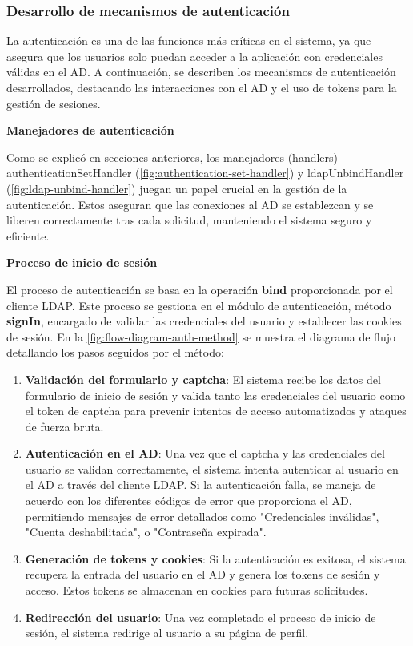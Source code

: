 \subsubsection{Desarrollo de mecanismos de autenticación}

La autenticación es una de las funciones más críticas en el sistema, ya que asegura que los usuarios solo puedan acceder a la aplicación con credenciales válidas en el AD. A continuación, se describen los mecanismos de autenticación desarrollados, destacando las interacciones con el AD y el uso de tokens para la gestión de sesiones.

\textbf{Manejadores de autenticación}

Como se explicó en secciones anteriores, los manejadores (handlers) authenticationSetHandler (\autoref{fig:authentication-set-handler})  y ldapUnbindHandler (\autoref{fig:ldap-unbind-handler}) juegan un papel crucial en la gestión de la autenticación. Estos aseguran que las conexiones al AD se establezcan y se liberen correctamente tras cada solicitud, manteniendo el sistema seguro y eficiente.

\textbf{Proceso de inicio de sesión}

El proceso de autenticación se basa en la operación \textbf{bind} proporcionada por el cliente LDAP. Este proceso se gestiona en el módulo de autenticación, método \textbf{signIn}, encargado de validar las credenciales del usuario y establecer las cookies de sesión. En la \autoref{fig:flow-diagram-auth-method} se muestra el diagrama de flujo detallando los pasos seguidos por el método:
\begin{enumerate}
    \item \textbf{Validación del formulario y captcha}: El sistema recibe los datos del formulario de inicio de sesión y valida tanto las credenciales del usuario como el token de captcha para prevenir intentos de acceso automatizados y ataques de fuerza bruta.
    \item \textbf{Autenticación en el AD}: Una vez que el captcha y las credenciales del usuario se validan correctamente, el sistema intenta autenticar al usuario en el AD a través del cliente LDAP. Si la autenticación falla, se maneja de acuerdo con los diferentes códigos de error que proporciona el AD, permitiendo mensajes de error detallados como "Credenciales inválidas", "Cuenta deshabilitada", o "Contraseña expirada".
    \item \textbf{Generación de tokens y cookies}: Si la autenticación es exitosa, el sistema recupera la entrada del usuario en el AD y genera los tokens de sesión y acceso. Estos tokens se almacenan en cookies para futuras solicitudes.
    \item \textbf{Redirección del usuario}: Una vez completado el proceso de inicio de sesión, el sistema redirige al usuario a su página de perfil.
\end{enumerate}

